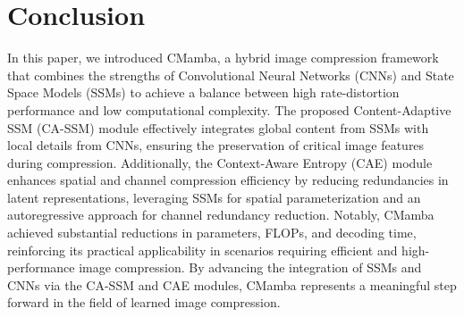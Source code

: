 \section{Conclusion}

In this paper, we introduced CMamba, a hybrid image compression framework that combines the strengths of Convolutional Neural Networks (CNNs) and State Space Models (SSMs) to achieve a balance between high rate-distortion performance and low computational complexity. 
The proposed Content-Adaptive SSM (CA-SSM) module effectively integrates global content from SSMs with local details from CNNs, ensuring the preservation of critical image features during compression. 
Additionally, the Context-Aware Entropy (CAE) module enhances spatial and channel compression efficiency by reducing redundancies in latent representations, leveraging SSMs for spatial parameterization and an autoregressive approach for channel redundancy reduction. 
Notably, CMamba achieved substantial reductions in parameters, FLOPs, and decoding time, reinforcing its practical applicability in scenarios requiring efficient and high-performance image compression. 
By advancing the integration of SSMs and CNNs via the CA-SSM and CAE modules, CMamba represents a meaningful step forward in the field of learned image compression.
